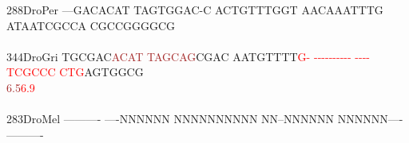 \documentclass[11pt,twoside,reqno,a4paper]{article}
\begin{document}
{288\hspace*{1\charwidth}DroPer	---GACACAT	TAGTGGAC-C	ACTGTTTGGT	AACAAATTTG	ATAATCGCCA	CGCCGGGGCG	\\
\hspace*{4\charwidth}\hspace*{7\charwidth}\hspace*{1\charwidth}\hspace*{1\charwidth}\hspace*{1\charwidth}\hspace*{1\charwidth}\hspace*{1\charwidth}\hspace*{1\charwidth}\\
344\hspace*{1\charwidth}DroGri	TGCGAC\textcolor{Brown}{A}\textcolor{Brown}{C}\textcolor{Brown}{A}\textcolor{Brown}{T}	\textcolor{Brown}{T}\textcolor{Brown}{A}\textcolor{Brown}{G}\textcolor{Brown}{C}\textcolor{Brown}{A}\textcolor{Brown}{G}CGAC	AATGTTTT\textcolor{Red}{G}\textcolor{Red}{-}	\textcolor{Red}{-}\textcolor{Red}{-}\textcolor{Red}{-}\textcolor{Red}{-}\textcolor{Red}{-}\textcolor{Red}{-}\textcolor{Red}{-}\textcolor{Red}{-}\textcolor{Red}{-}\textcolor{Red}{-}	\textcolor{Red}{-}\textcolor{Red}{-}\textcolor{Red}{-}\textcolor{Red}{-}\textcolor{Red}{T}\textcolor{Red}{C}\textcolor{Red}{G}\textcolor{Red}{C}\textcolor{Red}{C}\textcolor{Red}{C}	\textcolor{Red}{C}\textcolor{Red}{T}\textcolor{Red}{G}AGTGGCG	\\
\hspace*{4\charwidth}\hspace*{7\charwidth}\hspace*{6\charwidth}\textcolor{Brown}{6.5}\hspace*{1\charwidth}\hspace*{1\charwidth}\hspace*{19\charwidth}\textcolor{Red}{6.9}\hspace*{1\charwidth}\hspace*{1\charwidth}\hspace*{1\charwidth}\hspace*{1\charwidth}\\
\\
283\hspace*{1\charwidth}DroMel	----------	----NNNNNN	NNNNNNNNNN	NN--NNNNNN	NNNNNN----	----------	\\
\hspace*{4\charwidth}\hspace*{7\charwidth}\hspace*{1\charwidth}\hspace*{1\charwidth}\hspace*{1\charwidth}\hspace*{1\charwidth}\hspace*{1\charwidth}\hspace*{1\charwidth}\\
}
\end{document}
